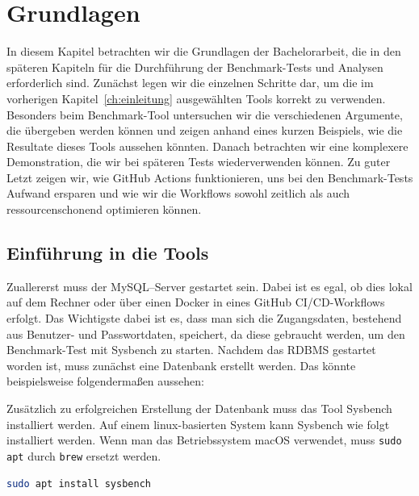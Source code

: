 \chapter{Grundlagen}\label{ch:grundlagen}

In diesem Kapitel betrachten wir die Grundlagen der Bachelorarbeit, die in den späteren Kapiteln für die Durchführung der Benchmark-Tests und Analysen erforderlich sind.
Zunächst legen wir die einzelnen Schritte dar, um die im vorherigen Kapitel~\ref{ch:einleitung} ausgewählten Tools korrekt zu verwenden.
Besonders beim Benchmark-Tool untersuchen wir die verschiedenen Argumente, die übergeben werden können und zeigen anhand eines kurzen Beispiels, wie die Resultate dieses Tools aussehen könnten.
Danach betrachten wir eine komplexere Demonstration, die wir bei späteren Tests wiederverwenden können.
Zu guter Letzt zeigen wir, wie GitHub Actions funktionieren, uns bei den Benchmark-Tests Aufwand ersparen und wie wir die Workflows sowohl zeitlich als auch ressourcenschonend optimieren können.

\section{Einführung in die Tools}\label{sec:einfuhrung-in-die-tools}

Zuallererst muss der MySQL–Server gestartet sein.
Dabei ist es egal, ob dies lokal auf dem Rechner oder über einen Docker in eines GitHub CI/CD-Workflows erfolgt.
Das Wichtigste dabei ist es, dass man sich die Zugangsdaten, bestehend aus Benutzer- und Passwortdaten, speichert, da diese gebraucht werden, um den Benchmark-Test mit Sysbench zu starten.
Nachdem das RDBMS gestartet worden ist, muss zunächst eine Datenbank erstellt werden.
Das könnte beispielsweise folgendermaßen aussehen:

\vspace{-5pt}

\vspace{-9pt}

Zusätzlich zu erfolgreichen Erstellung der Datenbank muss das Tool Sysbench installiert werden.
Auf einem linux-basierten System kann Sysbench wie folgt installiert werden.
Wenn man das Betriebssystem macOS verwendet, muss \texttt{sudo apt} durch \texttt{brew} ersetzt werden.

\vspace{-5pt}
\begin{lstlisting}[language=bash]
sudo apt install sysbench
\end{lstlisting}
\vspace{-9pt}

